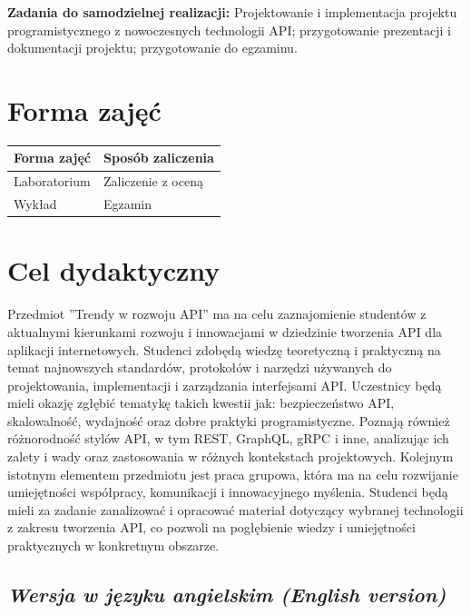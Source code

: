 \documentclass[12pt, a4paper]{article}
\begin{document}
\vspace{4pt}
\noindent\textbf{Zadania do samodzielnej realizacji:} Projektowanie i implementacja projektu programistycznego z nowoczesnych technologii API; przygotowanie prezentacji i dokumentacji projektu; przygotowanie do egzaminu.

\section{Forma zajęć}

\begin{tabular}{ll}
  \hline
  \textbf{Forma zajęć} & \textbf{Sposób zaliczenia} \\
  \hline
  Laboratorium & Zaliczenie z oceną \\
  Wykład & Egzamin \\
  \hline
\end{tabular}

\section{Cel dydaktyczny}

Przedmiot ''Trendy w rozwoju API'' ma na celu zaznajomienie studentów z aktualnymi kierunkami rozwoju i innowacjami w dziedzinie tworzenia API dla aplikacji internetowych. Studenci zdobędą wiedzę teoretyczną i praktyczną na temat najnowszych standardów, protokołów i narzędzi używanych do projektowania, implementacji i zarządzania interfejsami API. Uczestnicy będą mieli okazję zgłębić tematykę takich kwestii jak: bezpieczeństwo API, skalowalność, wydajność oraz dobre praktyki programistyczne. Poznają również różnorodność stylów API, w tym REST, GraphQL, gRPC i inne, analizując ich zalety i wady oraz zastosowania w różnych kontekstach projektowych. Kolejnym istotnym elementem przedmiotu jest praca grupowa, która ma na celu rozwijanie umiejętności współpracy, komunikacji i innowacyjnego myślenia. Studenci będą mieli za zadanie zanalizować i opracować materiał dotyczący wybranej technologii z zakresu tworzenia API, co pozwoli na pogłębienie wiedzy i umiejętności praktycznych w konkretnym obszarze.

\subsection*{\textit{Wersja w języku angielskim (English version)}}
\end{document}
